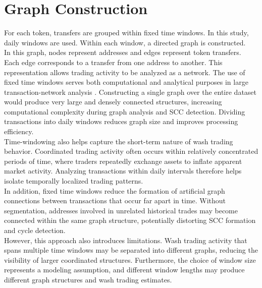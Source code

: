 \documentclass[language=english,thesis=bachelor,nosecondtitle,faculty=cb,onesided,13pt]{hsmw-thesis}
\begin{document}
\section{Graph Construction}
For each token, transfers are grouped within fixed time windows. In this study, daily windows are used. Within each window, a directed graph is constructed. \\
In this graph, nodes represent addresses and edges represent token transfers. Each edge corresponds to a transfer from one address to another. This representation allows trading activity to be analyzed as a network.
The use of fixed time windows serves both computational and analytical purposes in large transaction-network analysis \cite{chen2020traveling, sedgewick2011algorithms}. Constructing a single graph over the entire dataset would produce very large and densely connected structures, increasing computational complexity during graph analysis and SCC detection. Dividing transactions into daily windows reduces graph size and improves processing efficiency.\\
Time-windowing also helps capture the short-term nature of wash trading behavior. Coordinated trading activity often occurs within relatively concentrated periods of time, where traders repeatedly exchange assets to inflate apparent market activity. Analyzing transactions within daily intervals therefore helps isolate temporally localized trading patterns.\\
In addition, fixed time windows reduce the formation of artificial graph connections between transactions that occur far apart in time. Without segmentation, addresses involved in unrelated historical trades may become connected within the same graph structure, potentially distorting SCC formation and cycle detection.\\
However, this approach also introduces limitations. Wash trading activity that spans multiple time windows may be separated into different graphs, reducing the visibility of larger coordinated structures. Furthermore, the choice of window size represents a modeling assumption, and different window lengths may produce different graph structures and wash trading estimates.\\
\end{document}
